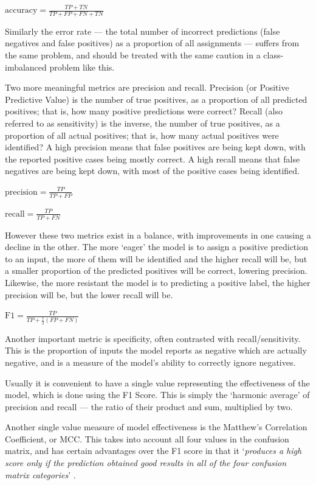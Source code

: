 $\mbox{accuracy} = \frac{TP + TN}{TP + FP + FN + TN}$

Similarly the error rate --- the total number of incorrect predictions (false negatives and false positives) as a proportion of all assignments --- suffers from the same problem, and should be treated with the same caution in a class-imbalanced problem like this.

Two more meaningful metrics are precision and recall. Precision (or Positive Predictive Value) is the number of true positives, as a proportion of all predicted positives; that is, how many positive predictions were correct? Recall (also referred to as sensitivity) is the inverse, the number of true positives, as a proportion of all actual positives; that is, how many actual positives were identified? A high precision means that false positives are being kept down, with the reported positive cases being mostly correct. A high recall means that false negatives are being kept down, with most of the positive cases being identified.

$\mbox{precision} = \frac{TP}{TP + FP}$

$\mbox{recall} = \frac{TP}{TP + FN}$

However these two metrics exist in a balance, with improvements in one causing a decline in the other. The more `eager' the model is to assign a positive prediction to an input, the more of them will be identified and the higher recall will be, but a smaller proportion of the predicted positives will be correct, lowering precision. Likewise, the more resistant the model is to predicting a positive label, the higher precision will be, but the lower recall will be.

$\mbox{F1} = \frac{TP}{TP + \frac{1}{2}(FP + FN)}$

Another important metric is specificity, often contrasted with recall/sensitivity. This is the proportion of inputs the model reports as negative which are actually negative, and is a measure of the model's ability to correctly ignore negatives.

Usually it is convenient to have a single value representing the effectiveness of the model, which is done using the F1 Score. This is simply the `harmonic average' of precision and recall --- the ratio of their product and sum, multiplied by two.

Another single value measure of model effectiveness is the Matthew's Correlation Coefficient, or MCC. This takes into account all four values in the confusion matrix, and has certain advantages over the F1 score in that it `\emph{produces a high score only if the prediction obtained good results in all of the four confusion matrix categories}' \cite{chicco2020mcc}.


